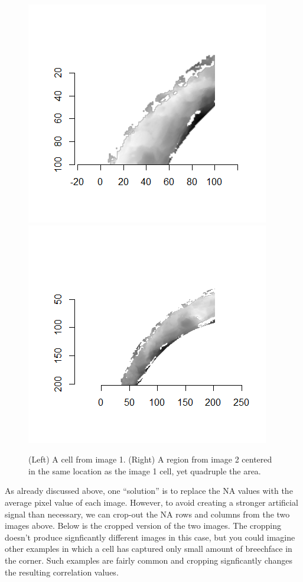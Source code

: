 \documentclass[]{book}
\begin{document}
\begin{figure}

{\centering \includegraphics[width=0.5\linewidth]{images/cartridge_cases/im1_split} \includegraphics[width=0.5\linewidth]{images/cartridge_cases/im2_split} 

}

\caption{(Left) A cell from image 1. (Right) A region from image 2 centered in the same location as the image 1 cell, yet quadruple the area.}\label{fig:unnamed-chunk-12}
\end{figure}

As already discussed above, one ``solution'' is to replace the NA values with the average pixel value of each image. However, to avoid creating a stronger artificial signal than necessary, we can crop-out the NA rows and columns from the two images above. Below is the cropped version of the two images. The cropping doesn't produce signficantly different images in this case, but you could imagine other examples in which a cell has captured only small amount of breechface in the corner. Such examples are fairly common and cropping signficantly changes the resulting correlation values.
\end{document}
